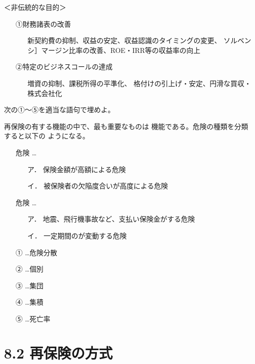 \documentclass[report,gutter=10mm,fore-edge=10mm,uplatex,dvipdfmx]{jlreq}
\begin{document}
\noindent ＜非伝統的な目的＞
\begin{itemize}
\item[]
①財務諸表の改善
\begin{itemize}
\item[]
新契約費の抑制、収益の安定、収益認識のタイミングの変更、
ソルベンシ］マージン比率の改善、ROE・IRR等の収益率の向上
\end{itemize}
\item[]
②特定のビジネスコールの達成
\begin{itemize}
\item[]
増資の抑制、課税所得の平準化、
格付けの引上げ・安定、円滑な買収・株式会社化
\end{itemize}
\end{itemize}

次の①～⑤を適当な語句で埋めよ。

再保険の有する機能の中で、最も重要なものは
機能である。危険の種類を分類すると以下の
ようになる。

\begin{itemize}
\item[] 危険 …
\begin{itemize}
\item[ア．] 保険金額が高額による危険
\item[イ．]  被保険者の欠陥度合いが高度による危険
\end{itemize}

\item[] 危険 …
\begin{itemize}
\item[ア．]  地震、飛行機事故など、支払い保険金がする危険
\item[イ．]  一定期間のが変動する危険
\end{itemize}
\end{itemize}

\answer{}
\begin{itemize}
\item[ ①] …危険分散
\item[ ②] …個別
\item[ ③] …集団
\item[ ④] …集積
\item[ ⑤] …死亡率
\end{itemize}

\section{8.2 再保険の方式}
\end{document}
